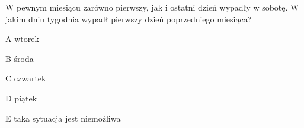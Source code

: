 \begin{tresc}
W pewnym miesiącu zarówno pierwszy, jak i ostatni dzień wypadły w sobotę. W jakim dniu tygodnia wypadł pierwszy dzień poprzedniego miesiąca?
\end{tresc}
\begin{wariant}{A} wtorek \end{wariant}
\begin{wariant}{B} środa \end{wariant}
\begin{wariant}{C} czwartek \end{wariant}
\begin{wariant}{D} piątek \end{wariant}
\begin{wariant}{E} taka sytuacja jest niemożliwa \end{wariant}
